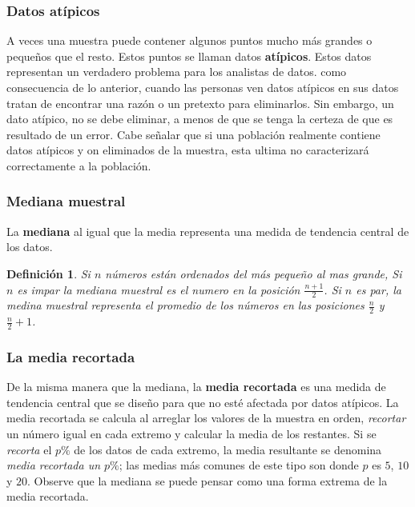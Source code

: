 \documentclass[10pt,a4paper]{book}
\newtheorem{defi}{\textbf{Definición}}
\begin{document}
\subsubsection{Datos atípicos}

A veces una muestra puede contener algunos puntos mucho más grandes o pequeños que el resto. Estos puntos se llaman datos \textbf{atípicos}. Estos datos representan un verdadero problema para los analistas de datos. como consecuencia de lo anterior, cuando las personas ven datos atípicos en sus datos tratan de encontrar una razón o un pretexto para eliminarlos. Sin embargo, un dato atípico, no se debe eliminar, a menos de que se tenga la certeza de que es resultado de un error. Cabe señalar que si una población realmente contiene datos atípicos y on eliminados de la muestra, esta ultima no caracterizará correctamente a la población.


\subsubsection{Mediana muestral}

La \textbf{mediana} al igual que la media representa una medida de tendencia central de los datos.

\begin{defi}
	Si $ n $ números están ordenados del más pequeño al mas grande, Si $ n $ es impar la mediana muestral es el numero en la posición $ \frac{n+1}{2}  $. Si $ n $ es par, la medina muestral representa el promedio de los números en las posiciones $ \frac{n}{2} $ y $\frac{n}{2} + 1$. 
\end{defi}

\subsubsection{La media recortada}

De la misma manera que la mediana, la \textbf{media recortada} es una medida de tendencia central que se diseño para que no esté afectada por datos atípicos. La media recortada se calcula al arreglar los valores de la muestra en orden, \textit{recortar} un número igual en cada extremo y calcular la media de los restantes. Si se \textit{recorta} el $ p\% $ de los datos de cada extremo, la media resultante se denomina \textit{media recortada un $ p\% $}; las medias más comunes de este tipo son donde $ p $ es $ 5 $, $ 10 $ y $ 20 $. Observe que la mediana se puede pensar como una forma extrema de la media recortada.\\
\end{document}
